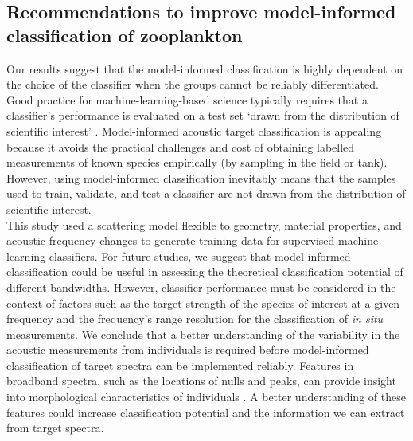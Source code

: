 \subsection{Recommendations to improve model-informed classification of zooplankton}
Our results suggest that the model-informed classification is highly dependent on the choice of the classifier when the groups cannot be reliably differentiated. Good practice for machine-learning-based science typically requires that a classifier's performance is evaluated on a test set `drawn from the distribution of scientific interest' \citep{Kapoor2022}. Model-informed acoustic target classification is appealing because it avoids the practical challenges and cost of obtaining labelled measurements of known species empirically (by sampling in the field or tank). However, using model-informed classification inevitably means that the samples used to train, validate, and test a classifier are not drawn from the distribution of scientific interest. \\
This study used a scattering model flexible to geometry, material properties, and acoustic frequency changes to generate training data for supervised machine learning classifiers. For future studies, we suggest that model-informed classification could be useful in assessing the theoretical classification potential of different bandwidths. However, classifier performance must be considered in the context of factors such as the target strength of the species of interest at a given frequency and the frequency's range resolution for the classification of \textit{in situ} measurements. We conclude that a better understanding of the variability in the acoustic measurements from individuals is required before model-informed classification of target spectra can be implemented reliably. Features in broadband spectra, such as the locations of nulls and peaks, can provide insight into morphological characteristics of individuals \citep{Reeder2004, Kubilius2020}. A better understanding of these features could increase classification potential and the information we can extract from target spectra.


